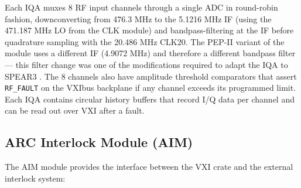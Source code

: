Each IQA muxes 8 RF input channels through a single ADC in round-robin fashion, downconverting from 476.3 MHz to the 5.1216 MHz IF (using the 471.187 MHz LO from the CLK module) and bandpass-filtering at the IF before quadrature sampling with the 20.486 MHz CLK20. The PEP-II variant of the module uses a different IF (4.9072 MHz) and therefore a different bandpass filter --- this filter change was one of the modifications required to adapt the IQA to SPEAR3 . The 8 channels also have amplitude threshold comparators that assert \texttt{RF\_FAULT} on the VXIbus backplane if any channel exceeds its programmed limit. Each IQA contains circular history buffers that record I/Q data per channel and can be read out over VXI after a fault.


\subsection{ARC Interlock Module (AIM)}

The AIM module provides the interface between the VXI crate and the external interlock system:

